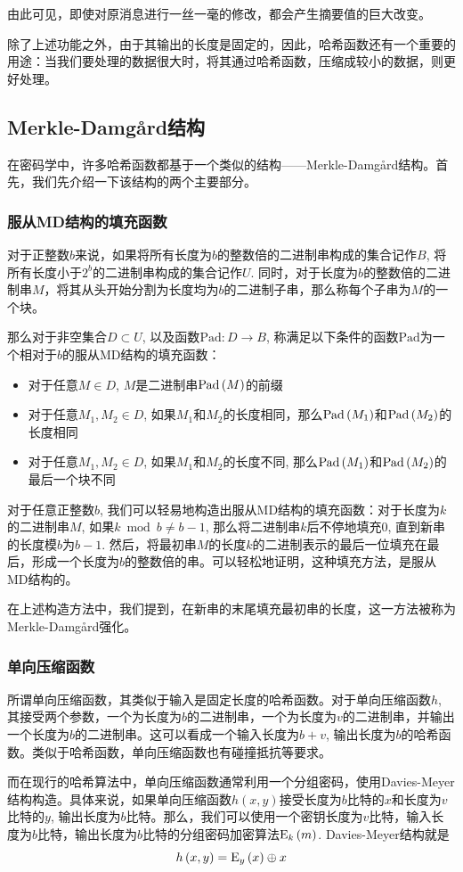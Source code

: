 由此可见，即使对原消息进行一丝一毫的修改，都会产生摘要值的巨大改变。\par
除了上述功能之外，由于其输出的长度是固定的，因此，哈希函数还有一个重要的用途：当我们要处理的数据很大时，将其通过哈希函数，压缩成较小的数据，则更好处理。
\subsection{Merkle-Damg\aa rd结构}
在密码学中，许多哈希函数都基于一个类似的结构——Merkle-Damg\aa rd结构。首先，我们先介绍一下该结构的两个主要部分。
\subsubsection{服从MD结构的填充函数}
对于正整数$b$来说，如果将所有长度为$b$的整数倍的二进制串构成的集合记作$B$, 将所有长度小于$2^b$的二进制串构成的集合记作$U$. 同时，对于长度为$b$的整数倍的二进制串$M$，将其从头开始分割为长度均为$b$的二进制子串，那么称每个子串为$M$的一个块。\par
那么对于非空集合$D\subset U$, 以及函数$\mathrm{Pad}:D\to B$, 称满足以下条件的函数$\mathrm{Pad}$为一个相对于$b$的服从MD结构的填充函数：
\begin{itemize}
	\item 对于任意$M\in D$, $M$是二进制串$\mathrm{Pad}\left( {M}\right)$的前缀
	\item 对于任意$M_1, M_2\in D$, 如果$M_1$和$M_2$的长度相同，那么$\mathrm{Pad}\left( {M_1}\right)$和$\mathrm{Pad}\left( {M_2}\right)$的长度相同
	\item 对于任意$M_1, M_2\in D$, 如果$M_1$和$M_2$的长度不同, 那么$\mathrm{Pad}\left( {M_1}\right)$和$\mathrm{Pad}\left( {M_2}\right)$的最后一个块不同
\end{itemize}

对于任意正整数$b$, 我们可以轻易地构造出服从MD结构的填充函数：对于长度为$k$的二进制串$M$, 如果$k\bmod b\neq b-1$, 那么将二进制串$k$后不停地填充$0$, 直到新串的长度模$b$为$b-1$. 然后，将最初串$M$的长度$k$的二进制表示的最后一位填充在最后，形成一个长度为$b$的整数倍的串。可以轻松地证明，这种填充方法，是服从MD结构的。\par
在上述构造方法中，我们提到，在新串的末尾填充最初串的长度，这一方法被称为Merkle-Damg\aa rd强化。
\subsubsection{单向压缩函数}
所谓单向压缩函数，其类似于输入是固定长度的哈希函数。对于单向压缩函数$h$, 其接受两个参数，一个为长度为$b$的二进制串，一个为长度为$v$的二进制串，并输出一个长度为$b$的二进制串。这可以看成一个输入长度为$b+v$, 输出长度为$b$的哈希函数。类似于哈希函数，单向压缩函数也有碰撞抵抗等要求。\par
而在现行的哈希算法中，单向压缩函数通常利用一个分组密码，使用Davies-Meyer结构构造。具体来说，如果单向压缩函数$h(x, y)$接受长度为$b$比特的$x$和长度为$v$比特的$y$, 输出长度为$b$比特。那么，我们可以使用一个密钥长度为$v$比特，输入长度为$b$比特，输出长度为$b$比特的分组密码加密算法${\mathrm{E}_{k}\left({m}\right)}$. Davies-Meyer结构就是
\begin{equation}
h\left( {x, y}\right)={\mathrm{E}_{y}\left({x}\right)}\oplus x
\end{equation}
